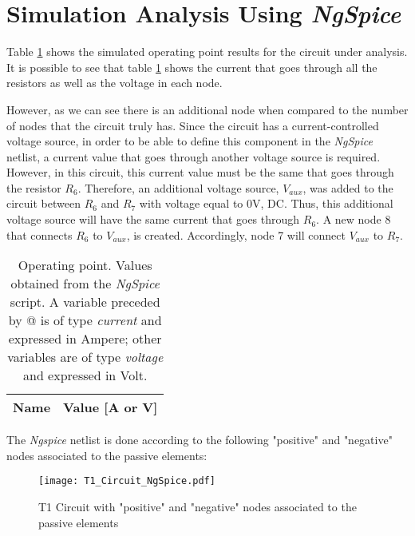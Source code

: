 \section{Simulation Analysis Using \emph{NgSpice}}
\label{sec:simulation}


Table \ref{op:tab_4} shows the simulated operating point results for the circuit
under analysis. It is possible to see that table \ref{op:tab_4} shows the current that goes through all the resistors as well as the voltage in each node. 

However, as we can see there is an additional node when compared to the number of nodes that the circuit truly has. Since the circuit has a current-controlled voltage source, in order to be able to define this component in the \emph{NgSpice} netlist, a current value that goes through another voltage source is required. However, in this circuit, this current value must be the same that goes through the resistor $R_6$. Therefore, an additional voltage source, $V_{aux}$, was added to the circuit between $R_6$ and $R_7$ with voltage equal to 0V, DC. Thus, this additional voltage source will have the same current that goes through $R_6$. A new node 8 that connects $R_6$ to $V_{aux}$, is created. Accordingly, node 7 will connect $V_{aux}$ to $R_7$.\\

\begin{table}[h]
  \centering
  \def\arraystretch{1.2}
 
\begin{tabular}{c|c}
    \hline    
    \textbf{Name} & \textbf{Value [A or V]} \\ \hline
    
    \hline
  \end{tabular}
  \captionsetup{justification=centering, margin=2cm}
  \caption{Operating point. Values obtained from the \emph{NgSpice} script. A variable preceded by @ is of type {\em current} and expressed in Ampere; other variables are of type {\it voltage} and expressed in Volt.}
  \label{op:tab_4}
\end{table}
\FloatBarrier

The \emph{Ngspice} netlist is done according to the following "positive" and "negative" nodes associated to the passive elements:
\begin{figure}[!htp] \centering
\texttt{[image: T1\_Circuit\_NgSpice.pdf]}
\captionsetup{justification=centering, margin=2cm}
\caption{T1 Circuit with "positive" and "negative" nodes associated to the passive elements}
\label{fig:t1circuitNgSpice}
\end{figure}
\FloatBarrier

